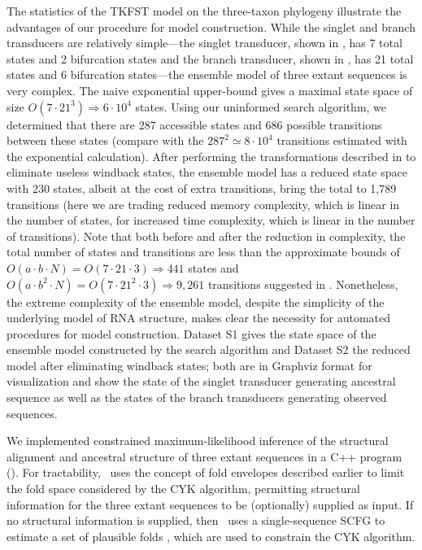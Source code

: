 \documentclass[10pt]{article}
\begin{document}
The statistics of the TKFST model on the three-taxon phylogeny
illustrate the advantages of our procedure for model construction.
While the singlet and branch transducers are relatively simple---the
singlet transducer, shown in , has 7 total states
and 2 bifurcation states and the branch transducer, shown in
, has 21 total states and 6 bifurcation
states---the ensemble model of three extant sequences is very complex.
The naive exponential upper-bound gives a maximal state space of size
$O(7 \cdot 21^{3}) \Rightarrow 6 \cdot 10^4$ states.  Using our
uninformed search algorithm, we determined that there are 287
accessible states and 686 possible transitions between these states
(compare with the $287^2 \simeq 8 \cdot 10^4$ transitions estimated
with the exponential calculation).  After performing the
transformations described in  to
eliminate useless windback states, the ensemble model has a reduced
state space with 230 states, albeit at the cost of extra transitions,
bring the total to 1,789 transitions (here we are trading reduced
memory complexity, which is linear in the number of states, for
increased time complexity, which is linear in the number of
transitions).  Note that both before and after the reduction in
complexity, the total number of states and transitions are less than
the approximate bounds of $O(a \cdot b \cdot N) = O(7 \cdot 21 \cdot
3) \Rightarrow 441$ states and $O(a \cdot b^2 \cdot N) = O(7 \cdot
21^2 \cdot 3) \Rightarrow 9,261$ transitions suggested in .
 Nonetheless, the extreme complexity of the
ensemble model, despite the simplicity of the underlying model of RNA
structure, makes clear the necessity for automated procedures for
model construction.  Dataset S1 gives the state space of the ensemble
model constructed by the search algorithm and Dataset S2 the reduced
model after eliminating windback states; both are in Graphviz format for
visualization and show the state of the singlet transducer generating
ancestral sequence as well as the states of the branch transducers
generating observed sequences.

We implemented constrained maximum-likelihood inference of the structural alignment 
and ancestral structure of three extant sequences in a C++ program (\indiegram).
For tractability, \indiegram\ uses the concept of fold envelopes
described earlier to limit the fold space considered by the CYK algorithm,
permitting structural information for the three extant sequences to be
(optionally) supplied as input.
If no structural information is supplied, then \indiegram\
uses a single-sequence SCFG to estimate a set of plausible folds \cite{Holmes2005},
which are used to constrain the CYK algorithm.
\end{document}
